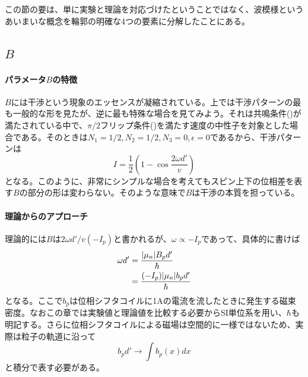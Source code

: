 この節の要は、単に実験と理論を対応づけたということではなく、波模様というあいまいな概念を輪郭の明確な4つの要素に分解したことにある。

\subsection{$B$}
\paragraph{パラメータ$B$の特徴}
$B$には干渉という現象のエッセンスが凝縮されている。上では干渉パターンの最も一般的な形を見たが、逆に最も特殊な場合を見てみよう。それは共鳴条件()が満たされている中で、$\pi/2$フリップ条件()を満たす速度の中性子を対象とした場合である。そのときは$N_1=1/2,N_2=1/2,N_3=0,\epsilon=0$であるから、干渉パターンは
\begin{equation}
I=\frac{1}{2}\left(1-\cos\frac{2\omega d'}{v}\right)
\end{equation}
となる。このように、非常にシンプルな場合を考えてもスピン上下の位相差を表す$B$の部分の形は変わらない。そのような意味で$B$は干渉の本質を担っている。

\paragraph{理論からのアプローチ}
理論的には$B$は$2\omega d'/v(-I_p)$と書かれるが、$\omega \propto -I_p$であって、具体的に書けば
\begin{align}
\omega d'&=\frac{|\mu_n|B_p d'}{\hbar} \\ \notag
&=\frac{(-I_p)|\mu_n| b_p d'}{\hbar}
\end{align}
となる。ここで$b_p$は位相シフタコイルに1Aの電流を流したときに発生する磁束密度。なおこの章では実験値と理論値を比較する必要からSI単位系を用い、$\hbar$も明記する。さらに位相シフタコイルによる磁場は空間的に一様ではないため、実際は粒子の軌道に沿って
\begin{equation}
b_p d' \rightarrow \int b_p(x) dx
\end{equation}
と積分で表す必要がある。

